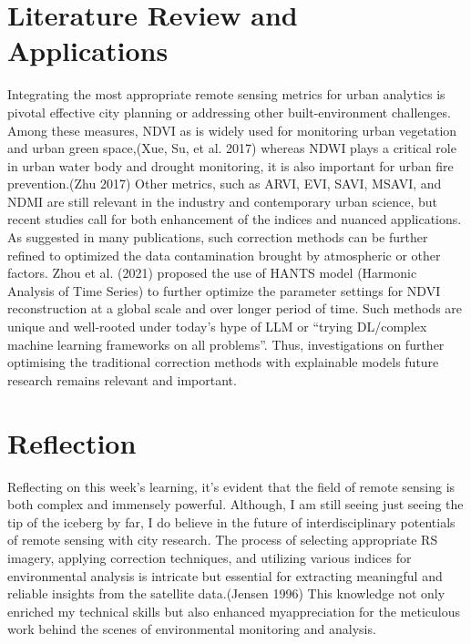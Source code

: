 \documentclass[
  letterpaper,
  DIV=11,
  numbers=noendperiod]{scrreprt}
\begin{document}
\hypertarget{literature-review-and-applications-1}{%
\section*{Literature Review and
Applications}\label{literature-review-and-applications-1}}


Integrating the most appropriate remote sensing metrics for urban
analytics is pivotal effective city planning or addressing other
built-environment challenges. Among these measures, NDVI as is widely
used for monitoring urban vegetation and urban green space,(Xue, Su, et
al. 2017) whereas NDWI plays a critical role in urban water body and
drought monitoring, it is also important for urban fire prevention.(Zhu
2017) Other metrics, such as ARVI, EVI, SAVI, MSAVI, and NDMI are still
relevant in the industry and contemporary urban science, but recent
studies call for both enhancement of the indices and nuanced
applications. As suggested in many publications, such correction methods
can be further refined to optimized the data contamination brought by
atmospheric or other factors. Zhou et al. (2021) proposed the use of
HANTS model (Harmonic Analysis of Time Series) to further optimize the
parameter settings for NDVI reconstruction at a global scale and over
longer period of time. Such methods are unique and well-rooted under
today's hype of LLM or ``trying DL/complex machine learning frameworks
on all problems''. Thus, investigations on further optimising the
traditional correction methods with explainable models future research
remains relevant and important.

\hypertarget{reflection}{%
\section*{Reflection}\label{reflection}}


Reflecting on this week's learning, it's evident that the field of
remote sensing is both complex and immensely powerful. Although, I am
still seeing just seeing the tip of the iceberg by far, I do believe in
the future of interdisciplinary potentials of remote sensing with city
research. The process of selecting appropriate RS imagery, applying
correction techniques, and utilizing various indices for environmental
analysis is intricate but essential for extracting meaningful and
reliable insights from the satellite data.(Jensen 1996) This knowledge
not only enriched my technical skills but also enhanced myappreciation
for the meticulous work behind the scenes of environmental monitoring
and analysis.
\end{document}
